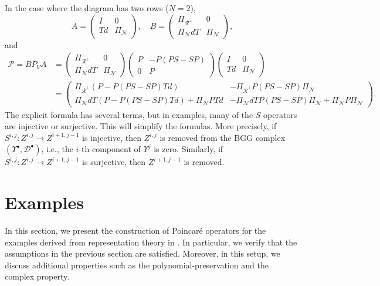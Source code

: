 \documentclass[11pt]{amsart}
\newcommand{\0}{\mathaccent23}
\renewcommand\ker{\mathcal{N}}
\newcommand\ran{\mathcal{R}}
\newcommand{\bs}{{\scriptscriptstyle \bullet}}
\begin{document}
In the case where the diagram has two rows ($N=2$),
\begin{equation}\label{ABN2}
A=\left (
\begin{array}{cc}
I & 0\\
Td & \Pi_{\ker}
\end{array}
\right ), \quad 
B=\left ( 
\begin{array}{cc}
\Pi_{\ran^{\perp}} & 0\\
\Pi_{\ker}dT & \Pi_{\ker}
\end{array}
\right ),
\end{equation}
and
\begin{align*}
\mathscr{P}=BP_{V}A&=\left ( 
\begin{array}{cc}
\Pi_{\ran^{\perp}} & 0\\
\Pi_{\ker}dT & \Pi_{\ker}
\end{array}
\right )\left ( 
\begin{array}{cc}
P & -P(PS-SP)\\
0 & P
\end{array}
\right )
\left (
\begin{array}{cc}
I & 0\\
Td & \Pi_{\ker}
\end{array}
\right )\\
&=\left (
\begin{array}{cc}
\Pi_{\ran^{\perp}}(P-P(PS-SP)Td) & -\Pi_{\ran^{\perp}}P(PS-SP)\Pi_{\ker}\\
\Pi_{\ker}dT(P-P(PS-SP)Td)+\Pi_{\ker}PTd & -\Pi_{\ker}dTP(PS-SP)\Pi_{\ker}+\Pi_{\ker}P\Pi_{\ker}
\end{array}
\right ).
\end{align*}
 The explicit formula has several terms, but in examples, many of the $S$ operators are injective or surjective. This will simplify the formulas. More precisely, if $S^{i, j}: Z^{i, j}\to Z^{i+1, j-1}$ is injective, then $Z^{i, j}$ is removed from the BGG complex $(\Upsilon^{\bs}, \mathscr{D}^{\bs})$, i.e., the $i$-th component of $\Upsilon^{j}$ is zero. Similarly, if $S^{i, j}: Z^{i, j}\to Z^{i+1, j-1}$ is surjective, then $Z^{i+1, j-1}$ is removed.
 

\section{Examples}\label{sec:examples}
In this section, we present the construction of Poincar\'e operators for the examples derived from representation theory in \cite{vcap2022bgg}. In particular, we verify that the assumptions in the previous section are satisfied. Moreover, in this setup, we discuss additional properties such as the polynomial-preservation and the complex property.
\end{document}

